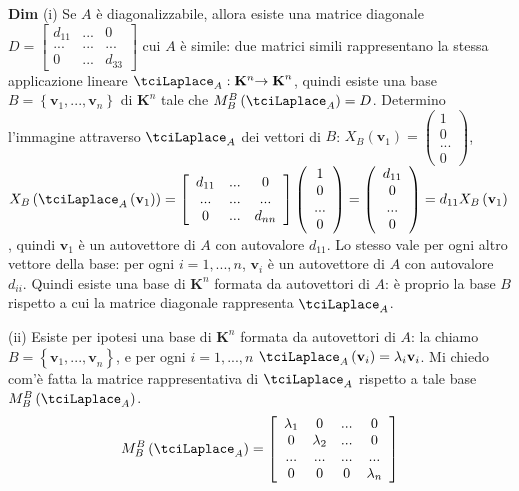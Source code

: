 \documentclass{article}
\begin{document}
\textbf{Dim} (i) Se $A$ \`{e} diagonalizzabile, allora esiste una matrice
diagonale $D=\left[ 
\begin{array}{ccc}
d_{11} & ... & 0 \\ 
... & ... & ... \\ 
0 & ... & d_{33}%
\end{array}%
\right] $ cui $A$ \`{e} simile: due matrici simili rappresentano la stessa
applicazione lineare $\tciLaplace _{A}:\mathbf{K}^{n}\mathbf{\rightarrow K}%
^{n}$, quindi esiste una base $B=\left\{ \mathbf{v}_{1},...,\mathbf{v}%
_{n}\right\} $ di $\mathbf{K}^{n}$ tale che $M_{B}^{B}\left( \tciLaplace
_{A}\right) =D$. Determino l'immagine attraverso $\tciLaplace _{A}$ dei
vettori di $B$: $X_{B}\left( \mathbf{v}_{1}\right) =\left( 
\begin{array}{c}
1 \\ 
0 \\ 
... \\ 
0%
\end{array}%
\right) $, $X_{B}\left( \tciLaplace _{A}\left( \mathbf{v}_{1}\right) \right)
=\left[ 
\begin{array}{ccc}
d_{11} & ... & 0 \\ 
... & ... & ... \\ 
0 & ... & d_{nn}%
\end{array}%
\right] \left( 
\begin{array}{c}
1 \\ 
0 \\ 
... \\ 
0%
\end{array}%
\right) =\left( 
\begin{array}{c}
d_{11} \\ 
0 \\ 
... \\ 
0%
\end{array}%
\right) =d_{11}X_{B}\left( \mathbf{v}_{1}\right) $, quindi $\mathbf{v}_{1}$ 
\`{e} un autovettore di $A$ con autovalore $d_{11}$. Lo stesso vale per ogni
altro vettore della base: per ogni $i=1,...,n$, $\mathbf{v}_{i}$ \`{e} un
autovettore di $A$ con autovalore $d_{ii}$. Quindi esiste una base di $%
\mathbf{K}^{n}$ formata da autovettori di $A$: \`{e} proprio la base $B$
rispetto a cui la matrice diagonale rappresenta $\tciLaplace _{A}$.

(ii) Esiste per ipotesi una base di $\mathbf{K}^{n}$ formata da autovettori
di $A$: la chiamo $B=\left\{ \mathbf{v}_{1}\mathbf{,...,v}_{n}\right\} $, e
per ogni $i=1,...,n$ $\tciLaplace _{A}\left( \mathbf{v}_{i}\right) =\lambda
_{i}\mathbf{v}_{i}$. Mi chiedo com'\`{e} fatta la matrice rappresentativa di 
$\tciLaplace _{A}$ rispetto a tale base $M_{B}^{B}\left( \tciLaplace
_{A}\right) $. 
\begin{equation*}
M_{B}^{B}\left( \tciLaplace _{A}\right) =\left[ 
\begin{array}{cccc}
\lambda _{1} & 0 & ... & 0 \\ 
0 & \lambda _{2} & ... & 0 \\ 
... & ... & ... & ... \\ 
0 & 0 & 0 & \lambda _{n}%
\end{array}%
\right]
\end{equation*}
\end{document}
